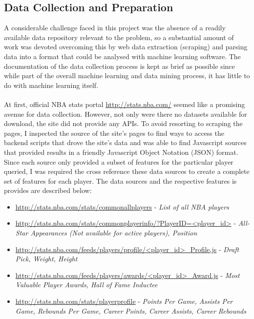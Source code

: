 \documentclass[paper=a4, fontsize=11pt]{scrartcl} %
\numberwithin{equation}{section} %
\numberwithin{figure}{section} %
\numberwithin{table}{section} %
\begin{document}
\subsection{Data Collection and Preparation}

A considerable challenge faced in this project was the absence of a readily available data repository relevant to the problem, so a substantial amount of work was devoted overcoming this by web data extraction (scraping) and parsing data into a format that could be analysed with machine learning software. The documentation of the data collection process is kept as brief as possible since while part of the overall machine learning and data mining process, it has little to do with machine learning itself.\\
\\
At first, official NBA stats portal \url{http://stats.nba.com/} seemed like a promising avenue for data collection. However, not only were there no datasets available for download, the site did not provide any APIs. To avoid resorting to scraping the pages, I inspected the source of the site's pages to find ways to access the backend scripts that drove the site's data and was able to find Javascript sources that provided results in a friendly Javascript Object Notation (JSON) format. Since each source only provided a subset of features for the particular player queried, I was required the cross reference these data sources to create a complete set of features for each player. The data sources and the respective features is provides are described below:

\begin{itemize}
\item \url{http://stats.nba.com/stats/commonallplayers} - \textit{List of all NBA players}
\item \url{http://stats.nba.com/stats/commonplayerinfo/?PlayerID=<player_id>} - \textit{All-Star Appearances (Not available for active players), Position}
\item \url{http://stats.nba.com/feeds/players/profile/<player_id>_Profile.js} - \textit{Draft Pick, Weight, Height}
\item \url{http://stats.nba.com/feeds/players/awards/<player_id>_Award.js} - \textit{Most Valuable Player Awards, Hall of Fame Inductee}
\item \url{http://stats.nba.com/stats/playerprofile} - \textit{Points Per Game, Assists Per Game, Rebounds Per Game, Career Points, Career Assists, Career Rebounds}
\end{itemize}
\end{document}
